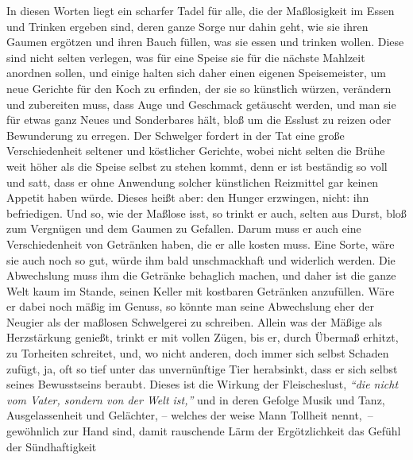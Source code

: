 \medskip

In diesen Worten liegt ein scharfer Tadel für alle, die der
Maßlosigkeit im Essen
und Trinken ergeben sind, deren ganze Sorge nur dahin geht, wie sie ihren
Gaumen ergötzen und ihren Bauch füllen, was sie essen und trinken wollen. Diese
sind nicht selten verlegen, was für eine Speise sie für die nächste Mahlzeit
anordnen sollen, und einige halten sich daher einen eigenen
Speisemeister, um
neue Gerichte für den Koch zu erfinden,
der sie so künstlich würzen, verändern
und zubereiten muss, dass Auge und Geschmack getäuscht werden, und man sie für
etwas ganz Neues und Sonderbares hält, bloß um die Esslust zu reizen oder
Bewunderung zu erregen. Der Schwelger fordert in der
Tat eine große
Verschiedenheit seltener und köstlicher Gerichte, wobei nicht selten die Brühe
weit höher als die Speise selbst zu stehen kommt, denn er ist beständig so voll
und satt, dass er ohne Anwendung solcher künstlichen
Reizmittel gar keinen
Appetit haben würde. Dieses heißt aber: den Hunger erzwingen, nicht: ihn
befriedigen. Und so, wie der Maßlose isst,
so trinkt er auch, selten aus Durst,
bloß zum Vergnügen und dem Gaumen zu Gefallen. Darum muss er
auch eine
Verschiedenheit von Getränken haben, die er alle kosten
muss. Eine Sorte, wäre
sie auch noch so gut, würde ihm bald unschmackhaft und widerlich werden. Die
Abwechslung muss ihm die Getränke behaglich machen, und daher ist die ganze Welt
kaum im Stande, seinen Keller mit kostbaren Getränken anzufüllen. Wäre er dabei
noch mäßig im Genuss, so könnte man seine Abwechslung eher der Neugier als der
maßlosen Schwelgerei
zu schreiben. Allein was
der Mäßige als Herzstärkung
genießt, trinkt er mit vollen Zügen, bis er, durch
Übermaß erhitzt, zu
Torheiten schreitet, und, wo nicht anderen, doch immer sich selbst Schaden
zufügt, ja, oft so tief unter das unvernünftige Tier herabsinkt, dass er sich
selbst seines Bewusstseins beraubt. Dieses ist die Wirkung der Fleischeslust,
\textit{"`die nicht vom Vater, sondern von der Welt ist,"'} und in deren Gefolge
Musik
und Tanz, Ausgelassenheit und Gelächter, -- welches der weise Mann
Tollheit
nennt,~-- gewöhnlich zur Hand sind, damit rauschende Lärm der 
Ergötzlichkeit das Gefühl der Sündhaftigkeit 
